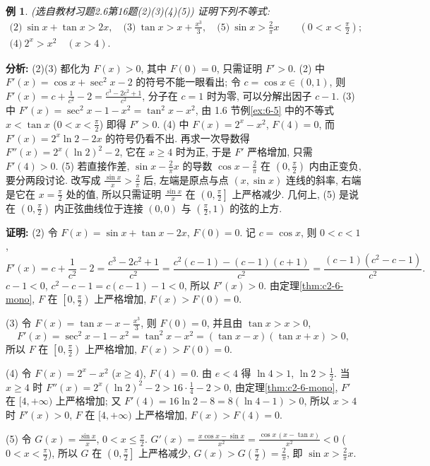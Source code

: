 \documentclass[UTF8,openany]{ctexbook}
\theoremstyle{chinesetextbook}
\newtheorem{example}{例}[section]
\newenvironment{cnproof}{\par\indent\textbf{证明:} \ignorespaces}{\par}
\begin{document}
\begin{example}\label{ex:c2-h6-16}
\textnormal{(选自教材习题2.6第16题(2)(3)(4)(5))} 证明下列不等式:
\[
\begin{gathered}
\text{(2)}\ \sin x+\tan x>2x,\quad\text{(3)}\ \tan x>x+\frac{x^3}3,\quad\text{(5)}\ \sin x>\frac2\pi x\qquad\left(0<x<\frac\pi2\right);\\
\text{(4)}\ 2^x>x^2\quad(x>4).
\end{gathered}
\]
\end{example}
\par\indent\textbf{分析:} (2)(3) 都化为 $F(x)>0$, 其中 $F(0)=0$, 只需证明 $F'>0$. (2) 中 $F'(x)=\cos x+\sec^2x-2$ 的符号不能一眼看出; 令 $c=\cos x\in(0,1)$, 则 $\displaystyle F'(x)=c+\frac1{c^2}-2=\frac{c^3-2c^2+1}{c^2}$, 分子在 $c=1$ 时为零, 可以分解出因子 $c-1$. (3) 中 $F'(x)=\sec^2x-1-x^2=\tan^2x-x^2$, 由 1.6 节例\ref{ex:6-5} 中的不等式 $x<\tan x$ ($\displaystyle0<x<\frac\pi2$) 即得 $F'>0$. (4) 中 $F(x)=2^x-x^2$, $F(4)=0$, 而 $F'(x)=2^x\ln2-2x$ 的符号仍看不出. 再求一次导数得 $F''(x)=2^x(\ln2)^2-2$, 它在 $x\ge4$ 时为正, 于是 $F'$ 严格增加, 只需 $F'(4)>0$. (5) 若直接作差, $\displaystyle\sin x-\frac2\pi x$ 的导数 $\displaystyle\cos x-\frac2\pi$ 在 $\displaystyle\left(0,\frac\pi2\right)$ 内由正变负, 要分两段讨论. 改写成 $\displaystyle\frac{\sin x}x>\frac2\pi$ 后, 左端是原点与点 $(x,\sin x)$ 连线的斜率, 右端是它在 $\displaystyle x=\frac\pi2$ 处的值, 所以只需证明 $\displaystyle\frac{\sin x}x$ 在 $\displaystyle\left(0,\frac\pi2\right]$ 上严格减少. 几何上, (5) 是说在 $\displaystyle\left(0,\frac\pi2\right)$ 内正弦曲线位于连接 $(0,0)$ 与 $\displaystyle\left(\frac\pi2,1\right)$ 的弦的上方.
\begin{cnproof}
(2) 令 $F(x)=\sin x+\tan x-2x$, $F(0)=0$. 记 $c=\cos x$, 则 $0<c<1$,
\[
F'(x)=c+\frac1{c^2}-2=\frac{c^3-2c^2+1}{c^2}=\frac{c^2(c-1)-(c-1)(c+1)}{c^2}=\frac{(c-1)(c^2-c-1)}{c^2}.
\]
$c-1<0$, $c^2-c-1=c(c-1)-1<0$, 所以 $F'(x)>0$. 由定理\ref{thm:c2-6-mono}, $F$ 在 $\displaystyle\left[0,\frac\pi2\right)$ 上严格增加, $F(x)>F(0)=0$.

(3) 令 $\displaystyle F(x)=\tan x-x-\frac{x^3}3$, 则 $F(0)=0$, 并且由 $\tan x>x>0$,
\[
F'(x)=\sec^2x-1-x^2=\tan^2x-x^2=(\tan x-x)(\tan x+x)>0,
\]
所以 $F$ 在 $\displaystyle\left[0,\frac\pi2\right)$ 上严格增加, $F(x)>F(0)=0$.

(4) 令 $F(x)=2^x-x^2$ ($x\ge4$), $F(4)=0$. 由 $e<4$ 得 $\ln4>1$, $\displaystyle\ln2>\frac12$. 当 $x\ge4$ 时 $\displaystyle F''(x)=2^x(\ln2)^2-2>16\cdot\frac14-2>0$, 由定理\ref{thm:c2-6-mono}, $F'$ 在 $[4,+\infty)$ 上严格增加; 又 $F'(4)=16\ln2-8=8(\ln4-1)>0$, 所以 $x>4$ 时 $F'(x)>0$, $F$ 在 $[4,+\infty)$ 上严格增加, $F(x)>F(4)=0$.

(5) 令 $\displaystyle G(x)=\frac{\sin x}x$, $\displaystyle0<x\le\frac\pi2$. $\displaystyle G'(x)=\frac{x\cos x-\sin x}{x^2}=\frac{\cos x\,(x-\tan x)}{x^2}<0$ ($\displaystyle0<x<\frac\pi2$), 所以 $G$ 在 $\displaystyle\left(0,\frac\pi2\right]$ 上严格减少, $\displaystyle G(x)>G\left(\frac\pi2\right)=\frac2\pi$, 即 $\displaystyle\sin x>\frac2\pi x$.
\end{cnproof}
\end{document}
